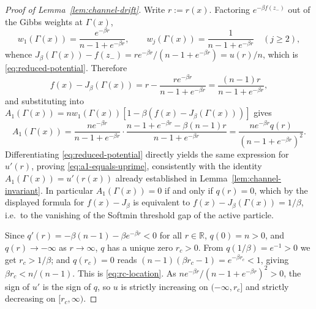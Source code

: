 \documentclass{article}
\theoremstyle{plain}
\theoremstyle{definition}
\theoremstyle{remark}
\newcommand{\prefactor}[2]{A_{#1}(#2)}
\newcommand{\R}{\mathbb{R}}
\begin{document}
\begin{proof}[Proof of Lemma~\ref{lem:channel-drift}]
    Write $r:=r(x)$. Factoring $e^{-\beta f(z_-)}$ out of the Gibbs weights at $\Gamma(x)$,
    \[
        w_1(\Gamma(x))=\frac{e^{-\beta r}}{n-1+e^{-\beta r}}, \qquad w_j(\Gamma(x))=\frac{1}{n-1+e^{-\beta r}} \quad (j\ge2),
    \]
    whence $J_\beta(\Gamma(x))-f(z_-)=re^{-\beta r}/(n-1+e^{-\beta r})=u(r)/n$, which is \eqref{eq:reduced-potential}. Therefore
    \[
        f(x)-J_\beta(\Gamma(x)) = r-\frac{re^{-\beta r}}{n-1+e^{-\beta r}} = \frac{(n-1)r}{n-1+e^{-\beta r}},
    \]
    and substituting into $\prefactor{1}{\Gamma(x)}=nw_1(\Gamma(x))[1-\beta(f(x)-J_\beta(\Gamma(x)))]$ gives
    \[
        \prefactor{1}{\Gamma(x)} = \frac{ne^{-\beta r}}{n-1+e^{-\beta r}}\cdot\frac{n-1+e^{-\beta r}-\beta(n-1)r}{n-1+e^{-\beta r}} = \frac{ne^{-\beta r}q(r)}{(n-1+e^{-\beta r})^2}.
    \]
    Differentiating \eqref{eq:reduced-potential} directly yields the same expression for $u'(r)$, proving \eqref{eq:a1-equals-uprime}, consistently with the identity $\prefactor{1}{\Gamma(x)}=u'(r(x))$ already established in Lemma~\ref{lem:channel-invariant}. In particular $\prefactor{1}{\Gamma(x)}=0$ if and only if $q(r)=0$, which by the displayed formula for $f(x)-J_\beta$ is equivalent to $f(x)-J_\beta(\Gamma(x))=1/\beta$, i.e.\ to the vanishing of the Softmin threshold gap of the active particle.

    Since $q'(r)=-\beta(n-1)-\beta e^{-\beta r}<0$ for all $r\in\R$, $q(0)=n>0$, and $q(r)\to-\infty$ as $r\to\infty$, $q$ has a unique zero $r_c>0$. From $q(1/\beta)=e^{-1}>0$ we get $r_c>1/\beta$; and $q(r_c)=0$ reads $(n-1)(\beta r_c-1)=e^{-\beta r_c}<1$, giving $\beta r_c<n/(n-1)$. This is \eqref{eq:rc-location}. As $ne^{-\beta r}/(n-1+e^{-\beta r})^2>0$, the sign of $u'$ is the sign of $q$, so $u$ is strictly increasing on $(-\infty,r_c]$ and strictly decreasing on $[r_c,\infty)$.
\end{proof}
\end{document}

